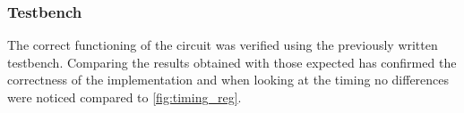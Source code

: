 \subsubsection{Testbench}
The correct functioning of the circuit was verified using the previously written testbench. Comparing the results obtained with those expected has confirmed the correctness of the implementation and when looking at the timing no differences were noticed compared to \autoref{fig:timing_reg}.
\pagebreak

